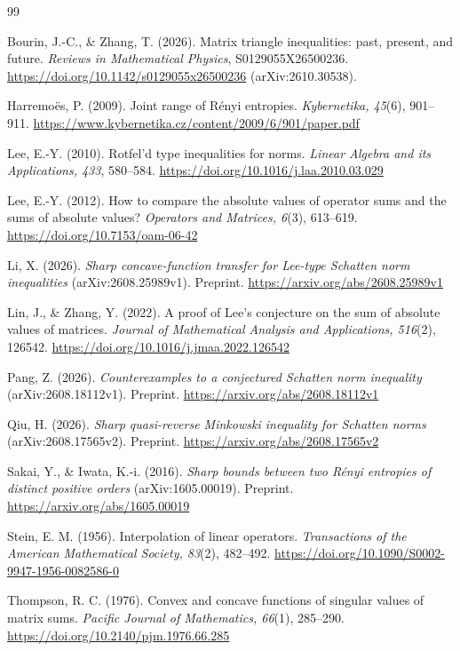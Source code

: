 \documentclass[11pt,a4paper]{article}
\numberwithin{equation}{section}
\theoremstyle{definition}
\theoremstyle{remark}
\begin{document}
\begin{thebibliography}{99}

Bourin, J.-C., \& Zhang, T. (2026).
Matrix triangle inequalities: past, present, and future.
\emph{Reviews in Mathematical Physics}, S0129055X26500236.
\url{https://doi.org/10.1142/s0129055x26500236}
(arXiv:2610.30538).

Harremoës, P. (2009).
Joint range of Rényi entropies.
\emph{Kybernetika, 45}(6), 901--911.
\url{https://www.kybernetika.cz/content/2009/6/901/paper.pdf}

Lee, E.-Y. (2010).
Rotfel'd type inequalities for norms.
\emph{Linear Algebra and its Applications, 433}, 580--584.
\url{https://doi.org/10.1016/j.laa.2010.03.029}

Lee, E.-Y. (2012).
How to compare the absolute values of operator sums and the sums of
absolute values?
\emph{Operators and Matrices, 6}(3), 613--619.
\url{https://doi.org/10.7153/oam-06-42}

Li, X. (2026).
\emph{Sharp concave-function transfer for Lee-type Schatten norm
inequalities} (arXiv:2608.25989v1). Preprint.
\url{https://arxiv.org/abs/2608.25989v1}

Lin, J., \& Zhang, Y. (2022).
A proof of Lee's conjecture on the sum of absolute values of matrices.
\emph{Journal of Mathematical Analysis and Applications, 516}(2), 126542.
\url{https://doi.org/10.1016/j.jmaa.2022.126542}

Pang, Z. (2026).
\emph{Counterexamples to a conjectured Schatten norm inequality}
(arXiv:2608.18112v1). Preprint.
\url{https://arxiv.org/abs/2608.18112v1}

Qiu, H. (2026).
\emph{Sharp quasi-reverse Minkowski inequality for Schatten norms}
(arXiv:2608.17565v2). Preprint.
\url{https://arxiv.org/abs/2608.17565v2}

Sakai, Y., \& Iwata, K.-i. (2016).
\emph{Sharp bounds between two Rényi entropies of distinct positive
orders} (arXiv:1605.00019). Preprint.
\url{https://arxiv.org/abs/1605.00019}

Stein, E. M. (1956).
Interpolation of linear operators.
\emph{Transactions of the American Mathematical Society, 83}(2), 482--492.
\url{https://doi.org/10.1090/S0002-9947-1956-0082586-0}

Thompson, R. C. (1976).
Convex and concave functions of singular values of matrix sums.
\emph{Pacific Journal of Mathematics, 66}(1), 285--290.
\url{https://doi.org/10.2140/pjm.1976.66.285}


\end{thebibliography}
\end{document}
